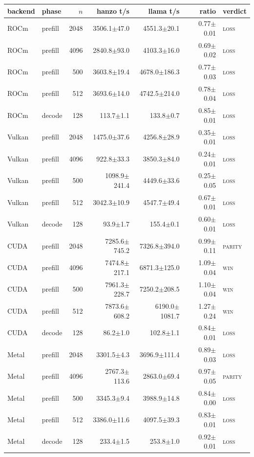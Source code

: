 \begin{tabular}{@{}llrrrrl@{}}
\toprule
backend & phase & $n$ & hanzo t/s & llama t/s & ratio & verdict \\
\midrule
ROCm & prefill & 2048 & 3506.1$\pm$47.0 & 4551.3$\pm$20.1 & 0.77$\pm$0.01 & \textsc{loss} \\
ROCm & prefill & 4096 & 2840.8$\pm$93.0 & 4103.3$\pm$16.0 & 0.69$\pm$0.02 & \textsc{loss} \\
ROCm & prefill & 500 & 3603.8$\pm$19.4 & 4678.0$\pm$186.3 & 0.77$\pm$0.03 & \textsc{loss} \\
ROCm & prefill & 512 & 3693.6$\pm$14.0 & 4742.5$\pm$214.0 & 0.78$\pm$0.04 & \textsc{loss} \\
ROCm & decode & 128 & 113.7$\pm$1.1 & 133.8$\pm$0.7 & 0.85$\pm$0.01 & \textsc{loss} \\
Vulkan & prefill & 2048 & 1475.0$\pm$37.6 & 4256.8$\pm$28.9 & 0.35$\pm$0.01 & \textsc{loss} \\
Vulkan & prefill & 4096 & 922.8$\pm$33.3 & 3850.3$\pm$84.0 & 0.24$\pm$0.01 & \textsc{loss} \\
Vulkan & prefill & 500 & 1098.9$\pm$241.4 & 4449.6$\pm$33.6 & 0.25$\pm$0.05 & \textsc{loss} \\
Vulkan & prefill & 512 & 3042.3$\pm$10.9 & 4547.7$\pm$49.4 & 0.67$\pm$0.01 & \textsc{loss} \\
Vulkan & decode & 128 & 93.9$\pm$1.7 & 155.4$\pm$0.1 & 0.60$\pm$0.01 & \textsc{loss} \\
CUDA & prefill & 2048 & 7285.6$\pm$745.2 & 7326.8$\pm$394.0 & 0.99$\pm$0.11 & \textsc{parity} \\
CUDA & prefill & 4096 & 7474.8$\pm$217.1 & 6871.3$\pm$125.0 & 1.09$\pm$0.04 & \textsc{win} \\
CUDA & prefill & 500 & 7961.3$\pm$228.7 & 7250.2$\pm$208.5 & 1.10$\pm$0.04 & \textsc{win} \\
CUDA & prefill & 512 & 7873.6$\pm$608.2 & 6190.0$\pm$1081.7 & 1.27$\pm$0.24 & \textsc{win} \\
CUDA & decode & 128 & 86.2$\pm$1.0 & 102.8$\pm$1.1 & 0.84$\pm$0.01 & \textsc{loss} \\
Metal & prefill & 2048 & 3301.5$\pm$4.3 & 3696.9$\pm$111.4 & 0.89$\pm$0.03 & \textsc{loss} \\
Metal & prefill & 4096 & 2767.3$\pm$113.6 & 2863.0$\pm$69.4 & 0.97$\pm$0.05 & \textsc{parity} \\
Metal & prefill & 500 & 3345.3$\pm$9.4 & 3988.9$\pm$14.8 & 0.84$\pm$0.00 & \textsc{loss} \\
Metal & prefill & 512 & 3386.0$\pm$11.6 & 4097.5$\pm$39.3 & 0.83$\pm$0.01 & \textsc{loss} \\
Metal & decode & 128 & 233.4$\pm$1.5 & 253.8$\pm$1.0 & 0.92$\pm$0.01 & \textsc{loss} \\
\bottomrule
\end{tabular}
